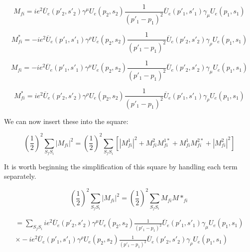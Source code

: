 \documentclass[a4]{article}
\begin{document}
    \begin{equation}
        M_{fi} = i e^2 \overline{U}_e (p'_2, s'_2) \gamma^{\mu} U_e (p_2, s_2) \frac{1}{(p'_1 - p_1)^2} \overline{U}_e (p'_1, s'_1) \gamma_{\mu} U_e (p_1, s_1)
    \end{equation}

    \begin{equation}
        M_{fi}^* = - i e^2 \overline{U}_e (p'_1, s'_1) \gamma^{\rho} U_e (p_2, s_2) \frac{1}{(p'_1 - p_1)^2} \overline{U}_e (p'_2, s'_2) \gamma_{\rho} U_e (p_1, s_1)
    \end{equation}

    \begin{equation}
        M_{fi} = - i e^2 \overline{U}_e (p'_1, s'_1) \gamma^{\mu} U_e (p_2, s_2) \frac{1}{(p'_1 - p_1)^2} \overline{U}_e (p'_2, s'_2) \gamma_{\mu} U_e (p_1, s_1)
    \end{equation}

    \begin{equation}
        M_{fi}^* = i e^2 \overline{U}_e (p'_2, s'_2) \gamma^{\rho} U_e (p_2, s_2) \frac{1}{(p'_1 - p_1)^2} \overline{U}_e (p'_1, s'_1) \gamma_{\rho} U_e (p_1, s_1)
    \end{equation}

    We can now insert these into the square:

    \begin{equation}
        (\frac{1}{2})^2 \sum_{S_f S_i} |M_{f i}|^2 = (\frac{1}{2})^2 \sum_{S_f S_i} [|M_{f i}^1|^2+M_{fi}^2 M_{fi}^{1*} + M_{fi}^1 M_{fi}^{2*} + |M_{f i}^2|^2]
    \end{equation}

    It is worth beginning the simplification of this square by handling each term separately.

    \begin{equation}
        (\frac{1}{2})^2 \sum_{S_f S_i} |M_{f i}|^2 = (\frac{1}{2})^2 \sum_{S_f S_i} M_{fi} M*_{fi}
    \end{equation}

    \begin{eqnarray}
        = \sum_{S_f S_i} i e^2 \overline{U}_e (p'_2, s'_2) \gamma^{\mu} U_e (p_2, s_2) \frac{1}{(p'_1 - p_1)^2} \overline{U}_e (p'_1, s'_1) \gamma_{\mu} U_e (p_1, s_1) \\
        \times - i e^2 \overline{U}_e (p'_1, s'_1) \gamma^{\rho} U_e (p_2, s_2) \frac{1}{(p'_1 - p_1)^2} \overline{U}_e (p'_2, s'_2) \gamma_{\rho} U_e (p_1, s_1)
    \end{eqnarray}
\end{document}

